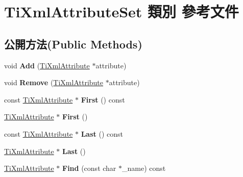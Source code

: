 \hypertarget{class_ti_xml_attribute_set}{}\section{Ti\+Xml\+Attribute\+Set 類別 參考文件}
\label{class_ti_xml_attribute_set}
\subsection*{公開方法(Public Methods)}
\begin{DoxyCompactItemize}
\item 
void {\bfseries Add} (\hyperlink{class_ti_xml_attribute}{Ti\+Xml\+Attribute} $\ast$attribute)\hypertarget{class_ti_xml_attribute_set_a745e50ddaae3bee93e4589321e0b9c1a}{}\label{class_ti_xml_attribute_set_a745e50ddaae3bee93e4589321e0b9c1a}

\item 
void {\bfseries Remove} (\hyperlink{class_ti_xml_attribute}{Ti\+Xml\+Attribute} $\ast$attribute)\hypertarget{class_ti_xml_attribute_set_a924a73d071f2573f9060f0be57879c57}{}\label{class_ti_xml_attribute_set_a924a73d071f2573f9060f0be57879c57}

\item 
const \hyperlink{class_ti_xml_attribute}{Ti\+Xml\+Attribute} $\ast$ {\bfseries First} () const \hypertarget{class_ti_xml_attribute_set_ae0636e88cedd4b09d61c451860f68598}{}\label{class_ti_xml_attribute_set_ae0636e88cedd4b09d61c451860f68598}

\item 
\hyperlink{class_ti_xml_attribute}{Ti\+Xml\+Attribute} $\ast$ {\bfseries First} ()\hypertarget{class_ti_xml_attribute_set_a99703bb08ca2aece2d7ef835de339ba0}{}\label{class_ti_xml_attribute_set_a99703bb08ca2aece2d7ef835de339ba0}

\item 
const \hyperlink{class_ti_xml_attribute}{Ti\+Xml\+Attribute} $\ast$ {\bfseries Last} () const \hypertarget{class_ti_xml_attribute_set_a7b3f3ccf39a97bc25539d3fcc540296a}{}\label{class_ti_xml_attribute_set_a7b3f3ccf39a97bc25539d3fcc540296a}

\item 
\hyperlink{class_ti_xml_attribute}{Ti\+Xml\+Attribute} $\ast$ {\bfseries Last} ()\hypertarget{class_ti_xml_attribute_set_ab4c4edfb2d74f6ea31aae096743bd6e0}{}\label{class_ti_xml_attribute_set_ab4c4edfb2d74f6ea31aae096743bd6e0}

\item 
\hyperlink{class_ti_xml_attribute}{Ti\+Xml\+Attribute} $\ast$ {\bfseries Find} (const char $\ast$\+\_\+name) const \hypertarget{class_ti_xml_attribute_set_af3675cc2bfd0aea153cda1cfcdd1f77e}{}\label{class_ti_xml_attribute_set_af3675cc2bfd0aea153cda1cfcdd1f77e}


\end{DoxyCompactItemize}
